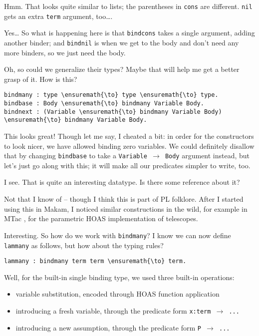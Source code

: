 \heroSTUDENT{} Hmm. That looks quite similar to lists; the parentheses in
\texttt{cons} are different. \texttt{nil} gets an extra \texttt{term}
argument, too\ldots{}.

\heroADVISOR{} Yes\ldots{} So what is happening here is that \texttt{bindcons}
takes a single argument, adding another binder; and \texttt{bindnil} is
when we get to the body and don't need any more binders, so we just need
the body.

\heroSTUDENT{} Oh, so could we generalize their types? Maybe that will help me
get a better grasp of it. How is this?

\begin{verbatim}
bindmany : type \ensuremath{\to} type \ensuremath{\to} type.
bindbase : Body \ensuremath{\to} bindmany Variable Body.
bindnext : (Variable \ensuremath{\to} bindmany Variable Body) \ensuremath{\to} bindmany Variable Body.
\end{verbatim}

\heroADVISOR{} This looks great! Though let me say, I cheated a bit: in order
for the constructors to look nicer, we have allowed binding zero
variables. We could definitely disallow that by changing
\texttt{bindbase} to take a \texttt{Variable\ \ensuremath{\to}\ Body}
argument instead, but let's just go along with this; it will make all
our predicates simpler to write, too.

\heroSTUDENT{} I see. That is quite an interesting datatype. Is there some
reference about it?

\heroADVISOR{} Not that I know of -- though I think this is part of PL
folklore. After I started using this in Makam, I noticed similar
constructions in the wild, for example in MTac \citep{ziliani2013mtac},
for the parametric HOAS implementation of telescopes.

\heroSTUDENT{} Interesting. So how do we work with \texttt{bindmany}? I know
we can now define \texttt{lammany} as follows, but how about the typing
rules?

\begin{verbatim}
lammany : bindmany term term \ensuremath{\to} term.
\end{verbatim}

\heroADVISOR{} Well, for the built-in single binding type, we used three
built-in operations:

\begin{itemize}
\tightlist
\item
  variable substitution, encoded through HOAS function application
\item
  introducing a fresh variable, through the predicate form
  \texttt{x:term\ \ensuremath{\to}\ ...}
\item
  introducing a new assumption, through the predicate form
  \texttt{P\ \ensuremath{\to}\ ...}
\end{itemize}

